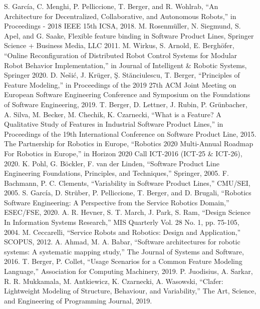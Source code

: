 \documentclass[conference]{IEEEtran}
\begin{document}
\begin{thebibliography}{00}
 S. Garc\'{i}a, C. Menghi, P. Pelliccione, T. Berger, and R. Wohlrab, ``An Architecture for Decentralized, Collaborative, and Autonomous Robots,'' in Proceedings - 2018 IEEE 15th ICSA, 2018.
 M. Rosenmüller, N. Siegmund, S. Apel, and G. Saake, Flexible feature binding in Software Product Lines, Springer Science + Business Media, LLC 2011.
 M. Wirkus, S. Arnold, E. Berghöfer, ``Online Reconfiguration of Distributed Robot Control Systems
for Modular Robot Behavior Implementation,'' in Journal of Intelligent \& Robotic Systems, Springer 2020.
 D. Nešić, J. Krüger, Ş. Stănciulescu, T. Berger, ``Principles of Feature Modeling,'' in  Proceedings of the 2019 27th ACM Joint Meeting on European Software Engineering Conference and Symposium on the Foundations of Software Engineering, 2019.
 T. Berger, D. Lettner, J. Rubin, P. Grünbacher, A. Silva, M. Becker,  M. Chechik, K. Czarnecki, ``What is a Feature? A Qualitative Study of Features in Industrial Software Product Lines,'' in  Proceedings of the 19th International Conference on Software Product Line, 2015.
 The Partnership for Robotics in Europe, ``Robotics 2020 Multi-Annual Roadmap For Robotics in Europe,'' in  Horizon 2020 Call ICT-2016 (ICT-25 \& ICT-26), 2020.
 K. Pohl, G. Böckler, F. van der Linden, ``Software Product Line Engineering Foundations, Principles, and Techniques,'' Springer, 2005.
 F. Bachmann, P. C. Clements, ``Variability in Software Product Lines,'' CMU/SEI, 2005.
 S. Garc\'{i}a, D. Strüber, P. Pelliccione, T. Berger, and D. Brugali, ``Robotics Software Engineering: A Perspective from the Service
Robotics Domain,''  ESEC/FSE, 2020.
 A. R. Hevner, S. T. March, J. Park, S. Ram, ``Design Science In Information Systems Research,'' MIS Quarterly Vol. 28 No. 1, pp. 75-105, 2004.
 M. Ceccarelli, ``Service Robots and Robotics: Design and Application,'' SCOPUS, 2012.
 A. Ahmad, M. A. Babar, ``Software architectures for robotic systems: A systematic mapping
study,'' The Journal of Systems and Software, 2016.
 T. Berger, P. Collet, ``Usage Scenarios for a Common Feature Modeling Language,'' Association for Computing Machinery, 2019.
 P. Juodisius, A. Sarkar, R. R. Mukkamala, M. Antkiewicz, K. Czarnecki, A. Wasowski, ``Clafer: Lightweight Modeling of Structure, Behaviour, and Variability,'' The Art, Science, and Engineering of Programming Journal, 2019.

\end{thebibliography}
\end{document}
